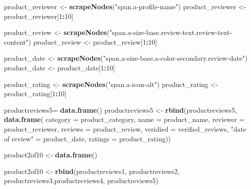 \documentclass[
]{article}
\newenvironment{Shaded}{\begin{snugshade}}{\end{snugshade}}
\newcommand{\AttributeTok}[1]{\textcolor[rgb]{0.13,0.29,0.53}{#1}}
\newcommand{\DecValTok}[1]{\textcolor[rgb]{0.00,0.00,0.81}{#1}}
\newcommand{\FunctionTok}[1]{\textcolor[rgb]{0.13,0.29,0.53}{\textbf{#1}}}
\newcommand{\NormalTok}[1]{#1}
\newcommand{\OtherTok}[1]{\textcolor[rgb]{0.56,0.35,0.01}{#1}}
\newcommand{\SpecialCharTok}[1]{\textcolor[rgb]{0.81,0.36,0.00}{\textbf{#1}}}
\newcommand{\StringTok}[1]{\textcolor[rgb]{0.31,0.60,0.02}{#1}}
\begin{document}
\begin{Shaded}
\begin{Highlighting}[]
\NormalTok{  product\_reviewer }\OtherTok{\textless{}{-}} \FunctionTok{scrapeNodes}\NormalTok{(}\StringTok{"span.a{-}profile{-}name"}\NormalTok{)}
\NormalTok{  product\_reviewer }\OtherTok{\textless{}{-}}\NormalTok{ product\_reviewer[}\DecValTok{1}\SpecialCharTok{:}\DecValTok{10}\NormalTok{]}
  
\NormalTok{  product\_review }\OtherTok{\textless{}{-}} \FunctionTok{scrapeNodes}\NormalTok{(}\StringTok{"span.a{-}size{-}base.review{-}text.review{-}text{-}content"}\NormalTok{)}
\NormalTok{  product\_review }\OtherTok{\textless{}{-}}\NormalTok{ product\_review[}\DecValTok{1}\SpecialCharTok{:}\DecValTok{10}\NormalTok{]}
  
\NormalTok{  product\_date }\OtherTok{\textless{}{-}} \FunctionTok{scrapeNodes}\NormalTok{(}\StringTok{"span.a{-}size{-}base.a{-}color{-}secondary.review{-}date"}\NormalTok{)}
\NormalTok{  product\_date }\OtherTok{\textless{}{-}}\NormalTok{ product\_date[}\DecValTok{1}\SpecialCharTok{:}\DecValTok{10}\NormalTok{]}
  
\NormalTok{  product\_rating }\OtherTok{\textless{}{-}} \FunctionTok{scrapeNodes}\NormalTok{(}\StringTok{"span.a{-}icon{-}alt"}\NormalTok{)}
\NormalTok{  product\_rating }\OtherTok{\textless{}{-}}\NormalTok{ product\_rating[}\DecValTok{1}\SpecialCharTok{:}\DecValTok{10}\NormalTok{]}
  
\NormalTok{  productreviews5}\OtherTok{=} \FunctionTok{data.frame}\NormalTok{()}
\NormalTok{  productreviews5 }\OtherTok{\textless{}{-}} \FunctionTok{rbind}\NormalTok{(productreviews5, }\FunctionTok{data.frame}\NormalTok{(}
                      \AttributeTok{category =}\NormalTok{ product\_category,}
                      \AttributeTok{name =}\NormalTok{ product\_name,}
                      \AttributeTok{reviewer =}\NormalTok{ product\_reviewer,}
                      \AttributeTok{reviews =}\NormalTok{ product\_review,}
                      \AttributeTok{veridied =}\NormalTok{ verified\_reviews,}
                      \StringTok{"date of review"} \OtherTok{=}\NormalTok{ product\_date,}
                      \AttributeTok{ratings =}\NormalTok{ product\_rating))}
  
\NormalTok{  product2of10 }\OtherTok{\textless{}{-}} \FunctionTok{data.frame}\NormalTok{()}
  
\NormalTok{  product2of10 }\OtherTok{\textless{}{-}} \FunctionTok{rbind}\NormalTok{(productreviews1, productreviews2, productreviews3,productreviews4, productreviews5)}
\end{Highlighting}
\end{Shaded}
\end{document}
